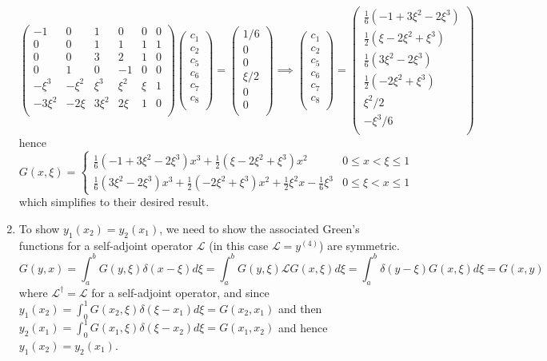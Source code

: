 \documentclass[a4paper]{article}
\begin{document}
\begin{ans}
\begin{enumerate}[label=(\roman*)]
$$\begin{pmatrix}-1&0&1&0&0&0\\0&0&1&1&1&1\\0&0&3&2&1&0\\0&1&0&-1&0&0\\-\xi^3&-\xi^2&\xi^3&\xi^2&\xi&1\\-3\xi^2&-2\xi&3\xi^2&2\xi&1&0\\\end{pmatrix}\begin{pmatrix}c_1\\c_2\\c_5\\c_6\\c_7\\c_8\\\end{pmatrix}=\begin{pmatrix}1/6\\0\\0\\\xi/2\\0\\0\\\end{pmatrix}\implies\begin{pmatrix}c_1\\c_2\\c_5\\c_6\\c_7\\c_8\\\end{pmatrix}=\begin{pmatrix}\frac{1}{6}(-1+3\xi^2-2\xi^3)\\\frac{1}{2}(\xi-2\xi^2+\xi^3)\\\frac{1}{6}(3\xi^2-2\xi^3)\\\frac{1}{2}(-2\xi^2+\xi^3)\\\xi^2/2\\-\xi^3/6\\\end{pmatrix}$$
hence
$$G(x,\xi)=
\left\{
        \begin{array}{ll}
      \frac{1}{6}(-1+3\xi^2-2\xi^3)x^3+\frac{1}{2}(\xi-2\xi^2+\xi^3)x^2 & 0\leq x<\xi\leq 1 \\
      \frac{1}{6}(3\xi^2-2\xi^3)x^3+\frac{1}{2}(-2\xi^2+\xi^3)x^2+\frac{1}{2}\xi^2x-\frac{1}{6}\xi^3& 0\leq \xi<x\leq 1
        \end{array}
    \right.$$
which simplifies to their desired result.
\item To show $y_1(x_2)=y_2(x_1)$, we need to show the associated Green's functions for a self-adjoint operator $\mathcal{L}$ (in this case $\mathcal{L}=y^{(4)}$) are symmetric.
$$G(y,x)=\int_a^bG(y,\xi)\delta(x-\xi)d\xi=\int_a^bG(y,\xi)\mathcal{L}G(x,\xi)d\xi=\int_a^b\delta(y-\xi)G(x,\xi)d\xi=G(x,y)$$
where $\mathcal{L}^\dag=\mathcal{L}$ for a self-adjoint operator, and since $y_1(x_2)=\int_0^1G(x_2,\xi)\delta(\xi-x_1)d\xi=G(x_2,x_1)$ and then $y_2(x_1)=\int_0^1G(x_1,\xi)\delta(\xi-x_2)d\xi=G(x_1,x_2)$ and hence $y_1(x_2)=y_2(x_1)$.
\end{enumerate}
\end{ans}
\end{document}
